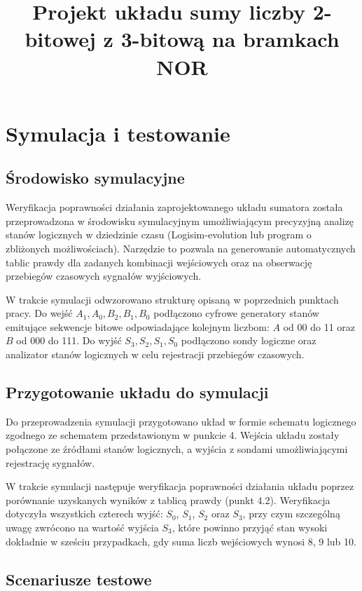 \documentclass[11pt]{article}
\title{Projekt układu sumy liczby 2-bitowej z 3-bitową na bramkach NOR}
\author{}
\date{}
\begin{document}
\maketitle

\section{Symulacja i testowanie}

\subsection{Środowisko symulacyjne}

Weryfikacja poprawności działania zaprojektowanego układu sumatora została przeprowadzona w środowisku symulacyjnym umożliwiającym precyzyjną analizę stanów logicznych w dziedzinie czasu (Logisim-evolution lub program o zbliżonych możliwościach). Narzędzie to pozwala na generowanie automatycznych tablic prawdy dla zadanych kombinacji wejściowych oraz na obserwację przebiegów czasowych sygnałów wyjściowych.

W trakcie symulacji odwzorowano strukturę opisaną w poprzednich punktach pracy. Do wejść \(A_1, A_0, B_2, B_1, B_0\) podłączono cyfrowe generatory stanów emitujące sekwencje bitowe odpowiadające kolejnym liczbom: \(A\) od 00 do 11 oraz \(B\) od 000 do 111. Do wyjść \(S_3, S_2, S_1, S_0\) podłączono sondy logiczne oraz analizator stanów logicznych w celu rejestracji przebiegów czasowych.

\subsection{Przygotowanie układu do symulacji}

Do przeprowadzenia symulacji przygotowano układ w formie schematu logicznego zgodnego ze schematem przedstawionym w punkcie 4. Wejścia układu zostały połączone ze źródłami stanów logicznych, a wyjścia z sondami umożliwiającymi rejestrację sygnałów.

W trakcie symulacji następuje weryfikacja poprawności działania układu poprzez porównanie uzyskanych wyników z tablicą prawdy (punkt 4.2). Weryfikacja dotyczyła wszystkich czterech wyjść: \(S_0\), \(S_1\), \(S_2\) oraz \(S_3\), przy czym szczególną uwagę zwrócono na wartość wyjścia \(S_3\), które powinno przyjąć stan wysoki dokładnie w sześciu przypadkach, gdy suma liczb wejściowych wynosi 8, 9 lub 10.

\subsection{Scenariusze testowe}
\end{document}
